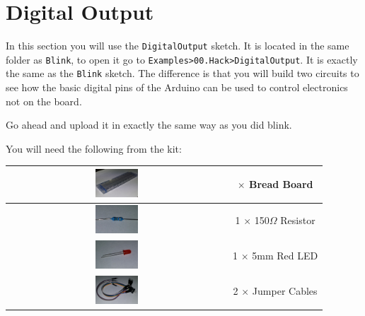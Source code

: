 \section{Digital Output}

In this section you will use the \lstinline|DigitalOutput| sketch.
It is located in the same folder as \lstinline|Blink|, 
to open it go to \lstinline{Examples>00.Hack>DigitalOutput}.
It is exactly the same as the \lstinline|Blink| sketch.
The difference is that you will build two circuits to see how 
the basic digital pins of the Arduino can be used to control electronics
not on the board.

Go ahead and upload it in exactly the same way as you did blink.

You will need the following from the kit:

\setlength{\tabcolsep}{0pt}
\begin{center}
\begin{tabular}{|c| c |}
\hline
    \includegraphics[align=c,width=0.2\textwidth]{./Graphics/breadboard}
    & 
    \begin{minipage}[t]{0.2\textwidth}
        \centering
        1 $\times$ Bread Board 
    \end{minipage}\\ \hline
    \includegraphics[align=c,width=0.2\textwidth]{./Graphics/150_resistor} 
    & 1 $\times$ 150$\Omega$ Resistor \\ \hline
    \includegraphics[align=c,width=0.2\textwidth]{./Graphics/red_led}
    & 1 $\times$ 5mm Red LED \\ \hline
    \includegraphics[align=c,width=0.2\textwidth]{./Graphics/jumper_cables}
    & 2 $\times$ Jumper Cables \\ \hline
  \end{tabular}
\end{center}

